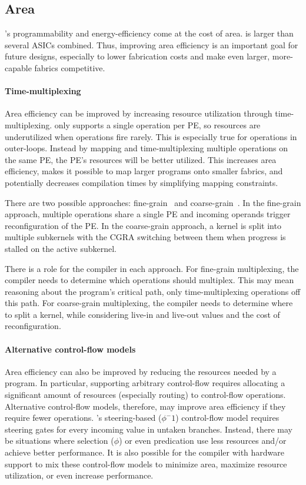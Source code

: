 \subsection{Area}
\riptide's programmability and energy-efficiency come at the cost of area.
% 
\riptide is larger than several ASICs combined.
% 
Thus, improving area efficiency is an important goal for future designs, especially to lower fabrication costs and make even larger, more-capable fabrics competitive.

\paragraph{Time-multiplexing}
Area efficiency can be improved by increasing resource utilization through time-multiplexing.
% 
\riptide only supports a single operation per PE, so resources are underutilized when operations fire rarely.
% 
This is especially true for operations in outer-loops.
% 
Instead by mapping and time-multiplexing multiple operations on the same PE, the PE's resources will be better utilized.
% 
This increases area efficiency, makes it possible to map larger programs onto smaller fabrics, and potentially decreases compilation times by simplifying mapping constraints.

There are two possible approaches: fine-grain~\cite{weng2020hybrid} and coarse-grain~\cite{nguyen2021fifer}.
% 
In the fine-grain approach, multiple operations share a single PE and incoming operands trigger reconfiguration of the PE.
% 
In the coarse-grain approach, a kernel is split into multiple subkernels with the CGRA switching between them when progress is stalled on the active subkernel.

There is a role for the compiler in each approach.
% 
For fine-grain multiplexing, the compiler needs to determine which operations should multiplex.
% 
This may mean reasoning about the program's critical path, only time-multiplexing operations off this path.
% 
For coarse-grain multiplexing, the compiler needs to determine where to split a kernel, while considering live-in and live-out values and the cost of reconfiguration.

\paragraph{Alternative control-flow models}
Area efficiency can also be improved by reducing the resources needed by a program.
% 
In particular, supporting arbitrary control-flow requires allocating a significant amount of resources (especially routing) to control-flow operations.
% 
Alternative control-flow models, therefore, may improve area efficiency if they require fewer operations.
% 
\riptide's steering-based ($\phi^-1$) control-flow model requires steering gates for every incoming value in untaken branches.
% 
Instead, there may be situations where selection ($\phi$) or even predication use less resources and/or achieve better performance.
% 
It is also possible for the compiler with hardware support to mix these control-flow models to minimize area, maximize resource utilization, or even increase performance.

